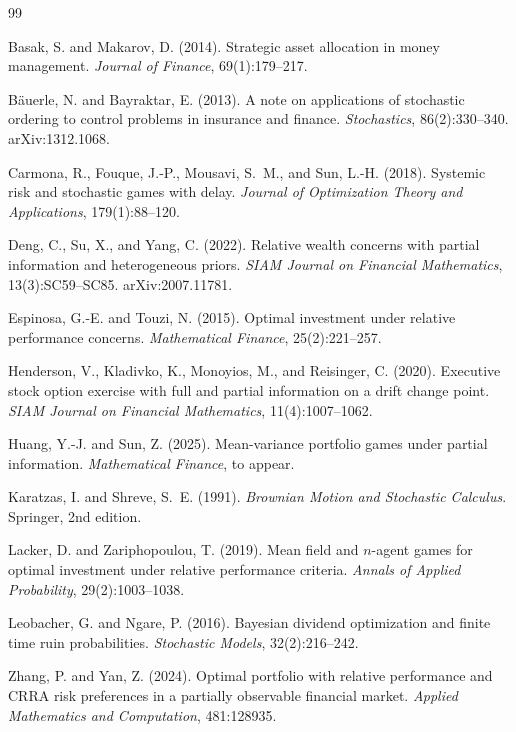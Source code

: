 \documentclass[12pt]{article}
\theoremstyle{remark}
\theoremstyle{definition}
\begin{document}


\begin{thebibliography}{99}


Basak, S. and Makarov, D. (2014).
\newblock Strategic asset allocation in money management.
\newblock \emph{Journal of Finance}, 69(1):179--217.

B{\"a}uerle, N. and Bayraktar, E. (2013).
\newblock A note on applications of stochastic ordering to control problems
  in insurance and finance.
\newblock \emph{Stochastics}, 86(2):330--340.
\newblock arXiv:1312.1068.

Carmona, R., Fouque, J.-P., Mousavi, S.~M., and Sun, L.-H. (2018).
\newblock Systemic risk and stochastic games with delay.
\newblock \emph{Journal of Optimization Theory and Applications},
  179(1):88--120.

Deng, C., Su, X., and Yang, C. (2022).
\newblock Relative wealth concerns with partial information and heterogeneous
  priors.
\newblock \emph{SIAM Journal on Financial Mathematics}, 13(3):SC59--SC85.
\newblock arXiv:2007.11781.

Espinosa, G.-E. and Touzi, N. (2015).
\newblock Optimal investment under relative performance concerns.
\newblock \emph{Mathematical Finance}, 25(2):221--257.

Henderson, V., Kladivko, K., Monoyios, M., and Reisinger, C. (2020).
\newblock Executive stock option exercise with full and partial information
  on a drift change point.
\newblock \emph{SIAM Journal on Financial Mathematics}, 11(4):1007--1062.

Huang, Y.-J. and Sun, Z. (2025).
\newblock Mean-variance portfolio games under partial information.
\newblock \emph{Mathematical Finance}, to appear.


Karatzas, I. and Shreve, S.~E. (1991).
\newblock \emph{Brownian Motion and Stochastic Calculus}.
\newblock Springer, 2nd edition.

Lacker, D. and Zariphopoulou, T. (2019).
\newblock Mean field and $n$-agent games for optimal investment under
  relative performance criteria.
\newblock \emph{Annals of Applied Probability}, 29(2):1003--1038.

Leobacher, G. and Ngare, P. (2016).
\newblock Bayesian dividend optimization and finite time ruin probabilities.
\newblock \emph{Stochastic Models}, 32(2):216--242.


Zhang, P. and Yan, Z. (2024).
\newblock Optimal portfolio with relative performance and CRRA risk preferences
  in a partially observable financial market.
\newblock \emph{Applied Mathematics and Computation}, 481:128935.

\end{thebibliography}
\end{document}
